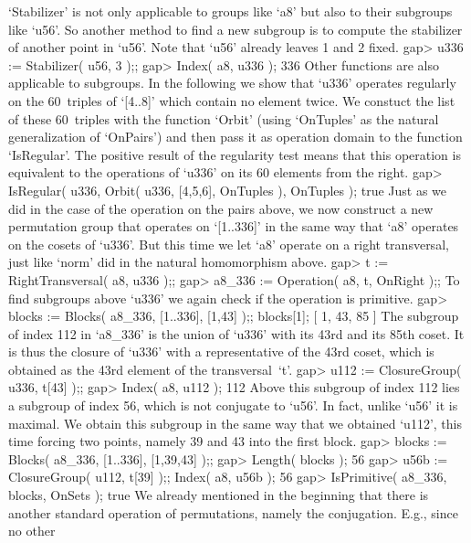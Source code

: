`Stabilizer' is not only applicable to groups like `a8' but also to their
subgroups like  `u56'. So another  method  to find  a  new subgroup is to
compute the stabilizer of another point in `u56'. Note that `u56' already
leaves 1 and 2 fixed.
\beginexample
    gap> u336 := Stabilizer( u56, 3 );;
    gap> Index( a8, u336 );
    336 
\endexample
Other  functions  are also applicable  to  subgroups. In the following we
show that  `u336' operates regularly on the  60~triples of `[4..8]' which
contain no element twice. We  constuct the list  of these 60~triples with
the function `Orbit' (using `OnTuples'  as the natural generalization  of
`OnPairs')  and   then  pass it   as  operation domain  to   the function
`IsRegular'.  The positive result of  the regularity test means that this
operation is equivalent  to the operations of `u336'  on  its 60 elements
from the right.
\beginexample
    gap> IsRegular( u336, Orbit( u336, [4,5,6], OnTuples ), OnTuples );
    true 
\endexample
Just as we did in the  case of the  operation on the  pairs above, we now
construct a new permutation group that operates on `[1..336]' in the same
way that `a8' operates on the cosets of `u336'. But this time we let `a8'
operate  on a right   transversal, just like  `norm'  did in  the natural
homomorphism above.
\beginexample
    gap> t := RightTransversal( a8, u336 );;
    gap> a8_336 := Operation( a8, t, OnRight );;
\endexample
To find  subgroups above  `u336'  we  again  check if  the  operation  is
primitive.
\beginexample
    gap> blocks := Blocks( a8_336, [1..336], [1,43] );; blocks[1];
    [ 1, 43, 85 ]
\endexample
The subgroup of index  112 in `a8_336'  is  the union of `u336'  with its
43rd and its  85th coset.   It  is thus   the  closure of `u336' with   a
representative of the  43rd coset, which  is obtained as the 43rd element
of the transversal~`t'.
\beginexample
    gap> u112 := ClosureGroup( u336, t[43] );;
    gap> Index( a8, u112 );
    112 
\endexample
Above this subgroup of index 112 lies a  subgroup  of index 56, which  is
not conjugate to `u56'.  In fact, unlike `u56' it is  maximal.  We obtain
this subgroup in  the same way that we obtained `u112', this time forcing
two points, namely 39 and 43 into the first block.
\beginexample
    gap> blocks := Blocks( a8_336, [1..336], [1,39,43] );;
    gap> Length( blocks );
    56
    gap> u56b := ClosureGroup( u112, t[39] );; Index( a8, u56b );
    56
    gap> IsPrimitive( a8_336, blocks, OnSets );
    true 
\endexample
We  already mentioned  in the beginning   that there is another  standard
operation of permutations, namely the  conjugation. E.g., since no  other
